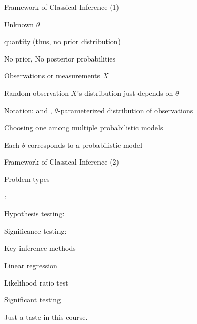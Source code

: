 \begin{frame}{Framework of Classical Inference (1)}

\plitemsep 0.08in

\begin{center}
\end{center}
\vspace{-0.5cm}
\bci
\item Unknown $\theta$

\bci
\item<2->  quantity (thus, no prior distribution)
\item<2-> No prior, No posterior probabilities
\eci



\item Observations or measurements $X$

\bci
\item<3-> Random observation $X$'s distribution just depends on $\theta$
\item<4-> Notation:  and , $\theta$-parameterized distribution of observations
\eci

\item<5-> Choosing one among multiple probabilistic models

\bci
\item Each $\theta$ corresponds to a probabilistic model
\eci

\eci


\end{frame}

\begin{frame}{Framework of Classical Inference (2)}

\plitemsep 0.1in

\bci
\item<2-> Problem types

\bci
\item {}: 
\item Hypothesis testing: 
\item Significance testing: 
\eci



\item<3-> Key inference methods

\bci
\item {}
\item Linear regression
\item Likelihood ratio test
\item Significant testing
\eci

\item<4-> Just a taste in this course.
\eci


\end{frame}

